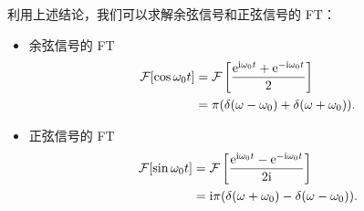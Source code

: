 \begin{example}[余弦信号与正弦信号的 FT]
    利用上述结论，我们可以求解余弦信号和正弦信号的 FT：
    \begin{itemize}
        \item 余弦信号的 FT
            \begin{align*}
                \mathcal{F}[\cos\omega_0t] & = \mathcal{F}\left[\frac{\mathrm{e}^{\mathrm{i} \omega_0 t} + \mathrm{e}^{-\mathrm{i} \omega_0 t}}{2}\right] \\
                & = \pi(\delta(\omega - \omega_0) + \delta(\omega + \omega_0)).
            \end{align*}
        \item 正弦信号的 FT
            \begin{align*}
                \mathcal{F}[\sin\omega_0t] & = \mathcal{F}\left[\frac{\mathrm{e}^{\mathrm{i} \omega_0 t} - \mathrm{e}^{-\mathrm{i} \omega_0 t}}{2\mathrm{i}}\right] \\
                & = \mathrm{i}\pi(\delta(\omega + \omega_0) - \delta(\omega - \omega_0)).
            \end{align*}
    \end{itemize}
\end{example}
